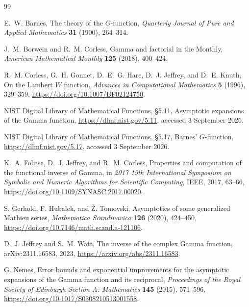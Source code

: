 \documentclass[11pt,oneside]{article}
\theoremstyle{plain}
\theoremstyle{definition}
\theoremstyle{remark}
\begin{document}
\begin{thebibliography}{99}

E.~W. Barnes,
\newblock The theory of the \(G\)-function,
\newblock \emph{Quarterly Journal of Pure and Applied Mathematics}
\textbf{31} (1900), 264--314.

J.~M. Borwein and R.~M. Corless,
\newblock Gamma and factorial in the Monthly,
\newblock \emph{American Mathematical Monthly} \textbf{125} (2018),
400--424.

R.~M. Corless, G.~H. Gonnet, D.~E.~G. Hare, D.~J. Jeffrey, and D.~E. Knuth,
\newblock On the Lambert \(W\) function,
\newblock \emph{Advances in Computational Mathematics} \textbf{5} (1996),
329--359,
\newblock \url{https://doi.org/10.1007/BF02124750}.

NIST Digital Library of Mathematical Functions,
\newblock \S5.11, Asymptotic expansions of the Gamma function,
\newblock \url{https://dlmf.nist.gov/5.11}, accessed 3 September 2026.

NIST Digital Library of Mathematical Functions,
\newblock \S5.17, Barnes' \(G\)-function,
\newblock \url{https://dlmf.nist.gov/5.17}, accessed 3 September 2026.

K.~A. Folitse, D.~J. Jeffrey, and R.~M. Corless,
\newblock Properties and computation of the functional inverse of Gamma,
\newblock in \emph{2017 19th International Symposium on Symbolic and Numeric
Algorithms for Scientific Computing}, IEEE, 2017, 63--66,
\newblock \url{https://doi.org/10.1109/SYNASC.2017.00020}.

S. Gerhold, F. Hubalek, and \v{Z}. Tomovski,
\newblock Asymptotics of some generalized Mathieu series,
\newblock \emph{Mathematica Scandinavica} \textbf{126} (2020), 424--450,
\newblock \url{https://doi.org/10.7146/math.scand.a-121106}.

D.~J. Jeffrey and S.~M. Watt,
\newblock The inverse of the complex Gamma function,
\newblock arXiv:2311.16583, 2023,
\newblock \url{https://arxiv.org/abs/2311.16583}.

G. Nemes,
\newblock Error bounds and exponential improvements for the asymptotic
expansions of the Gamma function and its reciprocal,
\newblock \emph{Proceedings of the Royal Society of Edinburgh Section A:
Mathematics} \textbf{145} (2015), 571--596,
\newblock \url{https://doi.org/10.1017/S0308210513001558}.


\end{thebibliography}
\end{document}
